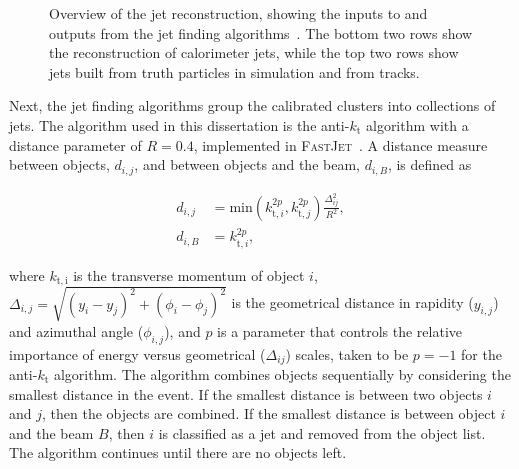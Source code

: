 \begin{figure}[htbp]
	\centering
	\caption{Overview of the jet reconstruction, showing the inputs to and outputs from the jet finding algorithms~\cite{TheATLASCollaboration:2015ds}. The bottom two rows show the reconstruction of calorimeter jets, while the top two rows show jets built from truth particles in simulation and from tracks.}
	\label{fig:reco-jet-reconstruction-flowchart}
\end{figure}


Next, the jet finding algorithms group the calibrated clusters into collections of jets. The algorithm used in this dissertation is the anti-$k_{\mathrm{t}}$ algorithm with a distance parameter of $R=0.4$, implemented in \textsc{FastJet}~\cite{Cacciari:2008gp,Cacciari:2011ma}. A distance measure between objects, $d_{i,j}$, and between objects and the beam, $d_{i,B}$, is defined as

\begin{align}
	d_{i,j} &= \mathrm{min}(k_{\mathrm{t}, i}^{2p}, k_{\mathrm{t}, j}^{2p}) \frac{\Delta_{ij}^2}{R^2}, \\
	d_{i,B} &= k_{\mathrm{t},i}^{2p},
\end{align}

where $k_{\mathrm{t,i}}$ is the transverse momentum of object $i$, $\Delta_{i,j}=\sqrt{(y_i-y_j)^2+(\phi_i-\phi_j)^2}$ is the geometrical distance in rapidity ($y_{i,j}$) and azimuthal angle ($\phi_{i,j}$), and $p$ is a parameter that controls the relative importance of energy versus geometrical ($\Delta_{ij}$) scales, taken to be $p=-1$ for the anti-$k_{\mathrm{t}}$ algorithm. The algorithm combines objects sequentially by considering the smallest distance in the event. If the smallest distance is between two objects $i$ and $j$, then the objects are combined. If the smallest distance is between object $i$ and the beam $B$, then $i$ is classified as a jet and removed from the object list. The algorithm continues until there are no objects left. 

